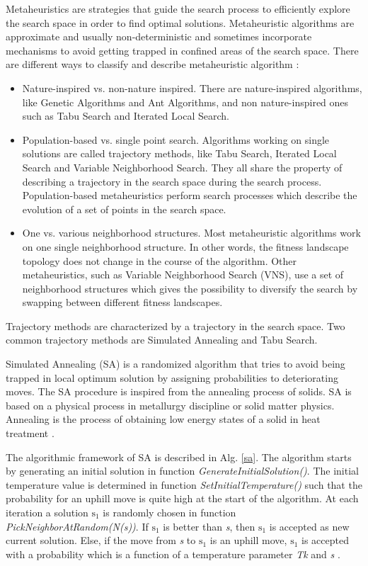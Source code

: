 \documentclass[times]{stvrauth}
\begin{document}
Metaheuristics are strategies that guide the search process to efficiently explore the search space in order to find optimal solutions. Metaheuristic algorithms are approximate and usually non-deterministic and sometimes incorporate mechanisms to avoid getting trapped in confined areas of the search space. There are different ways to classify and describe metaheuristic algorithm \cite{Blum2003}:

\begin{itemize}
\item Nature-inspired vs. non-nature inspired. There are nature-inspired algorithms, like Genetic Algorithms and Ant Algorithms, and non nature-inspired ones such as Tabu Search and Iterated Local Search. 

\item Population-based vs. single point search. Algorithms working on single solutions are called trajectory methods, like Tabu Search, Iterated Local Search and Variable Neighborhood Search. They all share the property of describing a trajectory in the search space during the search process. Population-based metaheuristics perform search processes which describe the evolution of a set of points in the search space.

\item One vs. various neighborhood structures. Most metaheuristic algorithms work on one single neighborhood structure. In other words, the fitness landscape topology does not change in the course of the algorithm. Other metaheuristics, such as Variable Neighborhood Search (VNS), use a set of neighborhood structures which gives the possibility to diversify the search by swapping between different fitness
landscapes.


\end{itemize}

Trajectory methods are characterized by a trajectory in the search space. Two common trajectory methods are Simulated Annealing and Tabu Search.

Simulated Annealing (SA) is a randomized algorithm that tries to avoid being trapped in local optimum solution by assigning probabilities to deteriorating moves. The SA procedure is inspired from the annealing process of solids. SA is based on a physical
process in metallurgy discipline or solid matter physics. Annealing is the process of obtaining low energy states of a solid in heat treatment \cite{Jaziri2008}. 

The algorithmic framework of SA is described in Alg. \ref{sa}.  The algorithm starts by generating an initial solution in function \textit{GenerateInitialSolution()}. The initial temperature value is determined in function \textit{SetInitialTemperature()} such that the probability for an uphill move is quite high at the start of the algorithm. At each iteration a solution $\mbox{s}_1$ is randomly chosen in function \textit{PickNeighborAtRandom(N(s))}. If \textit{$\mbox{s}_1$} is better than \textit{s}, then \textit{$\mbox{s}_1$} is accepted as new current solution. Else, if the move from \textit{s} to \textit{$\mbox{s}_1$} is an uphill move, \textit{$\mbox{s}_1$}  is accepted with a probability which is a function of a temperature parameter \textit{Tk} and \textit{s} \cite{raidl2010metaheuristic}. 
\end{document}
